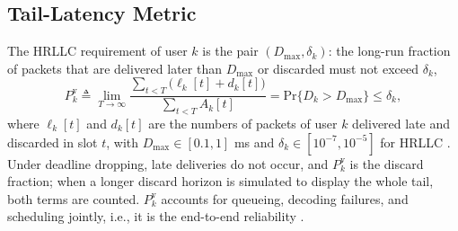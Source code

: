\documentclass[journal]{IEEEtran}
\renewcommand{\Pr}{\mathrm{Pr}}
\newcommand{\Dmax}{D_{\max}}
\begin{document}
\subsection{Tail-Latency Metric}
The HRLLC requirement of user $k$ is the pair $(\Dmax,\delta_k)$: the long-run fraction of packets that are delivered later than $\Dmax$ or discarded must not exceed $\delta_k$,
\begin{equation}\label{eq:tail}
P_k^{\mathrm v}\triangleq\lim_{T\to\infty}\frac{\sum_{t<T}\big(\ell_k[t]+d_k[t]\big)}{\sum_{t<T}A_k[t]}=\Pr\{D_k>\Dmax\}\le\delta_k,
\end{equation}
where $\ell_k[t]$ and $d_k[t]$ are the numbers of packets of user $k$ delivered late and discarded in slot $t$, with $\Dmax\in[0.1,1]$ ms and $\delta_k\in[10^{-7},10^{-5}]$ for HRLLC \cite{ITUR-M2160}. Under deadline dropping, late deliveries do not occur, and $P_k^{\mathrm v}$ is the discard fraction; when a longer discard horizon is simulated to display the whole tail, both terms are counted. $P_k^{\mathrm v}$ accounts for queueing, decoding failures, and scheduling jointly, i.e., it is the end-to-end reliability \cite{She2018CrossLayer}.

\end{document}
